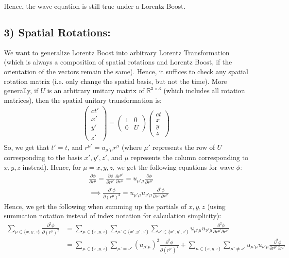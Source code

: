 \documentclass{article}
\newcommand{\RR}{\mathbb{R}}
\begin{document}
Hence, the wave equation is still true under a Lorentz Boost.

\subsection*{3) Spatial Rotations:}
We want to generalize Lorentz Boost into arbitrary Lorentz Transformation (which is always a composition of spatial rotations and Lorentz Boost, if the orientation of the vectors remain the same). Hence, it suffices to check any spatial rotation matrix (i.e. only change the spatial basis, but not the time). More generally, if $U$ is an arbitrary unitary matrix of $\RR^{3\times 3}$ (which includes all rotation matrices), then the spatial unitary transformation is:
\begin{align}
    \begin{pmatrix}
        ct'\\x'\\y'\\z'
    \end{pmatrix}=\left(\begin{array}{c|c}
        1 & 0\\
        \hline
        0 & U
    \end{array}\right)\begin{pmatrix}
        ct\\x\\y\\z
    \end{pmatrix}
\end{align}
So, we get that $t' = t$, and $r^{\mu'} = u_{\mu'\mu}r^\mu$ (where $\mu'$ represents the row of $U$ corresponding to the basis $x',y',z'$, and $\mu$ represents the column corresponding to $x,y,z$ instead). Hence, for $\mu=x,y,z$, we get the following equations for wave $\phi$:
\begin{align}
    &\frac{\partial\phi}{\partial r^\mu} = \frac{\partial\phi}{\partial r^{\mu'}}\frac{\partial r^{\mu'}}{\partial r^\mu} = u_{\mu'\mu}\frac{\partial\phi}{\partial r^{\mu'}}\\
    &\implies \frac{\partial^2\phi}{\partial (r^\mu)^2} = u_{\mu'\mu}u_{\nu'\mu}\frac{\partial^2\phi}{\partial r^{\mu'}\partial r^{\nu'}}
\end{align}
Hence, we get the following when summing up the partials of $x,y,z$ (using summation notation instead of index notation for calculation simplicity):
\begin{align}
    \sum_{\mu \in \{x,y,z\}}\frac{\partial^2\phi}{\partial (r^\mu)^2} &= \sum_{\mu\in\{x,y,z\}}\sum_{\mu'\in\{x',y',z'\}}\sum_{\nu'\in\{x',y',z'\}}u_{\mu'\mu}u_{\nu'\mu}\frac{\partial^2\phi}{\partial r^{\mu'}\partial r^{\nu'}}\\
    &= \sum_{\mu\in\{x,y,z\}}\sum_{\mu'=\nu'}(u_{\mu'\mu})^2\frac{\partial^2\phi}{\partial (r^{\mu'})^2} + \sum_{\mu\in \{x,y,z\}}\sum_{\mu'\neq \nu'}u_{\mu'\mu}u_{\nu'\mu}\frac{\partial^2\phi}{\partial r^{\mu'}\partial r^{\nu'}}
\end{align}
\end{document}
